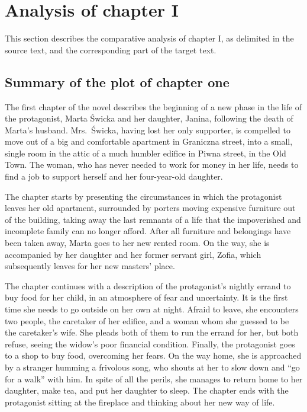 \section{Analysis of chapter I}

This section describes the comparative analysis of chapter I, as delimited in the source text, and the corresponding part of the target text.

\subsection{Summary of the plot of chapter one}
The first chapter of the novel describes the beginning of a new phase in the life of the protagonist, Marta Świcka and her daughter, Janina, following the death of Marta's husband.
Mrs.\ Świcka, having lost her only supporter, is compelled to move out of a big and comfortable apartment in Graniczna street, into a small, single room in the attic of a much humbler edifice in Piwna street, in the Old Town.
The woman, who has never needed to work for money in her life, needs to find a job to support herself and her four-year-old daughter.

The chapter starts by presenting the circumstances in which the protagonist leaves her old apartment, surrounded by porters moving expensive furniture out of the building, taking away the last remnants of a life that the impoverished and incomplete family can no longer afford.
After all furniture and belongings have been taken away, Marta goes to her new rented room.
On the way, she is accompanied by her daughter and her former servant girl, Zofia, which subsequently leaves for her new masters' place.

The chapter continues with a description of the protagonist's nightly errand to buy food for her child, in an atmosphere of fear and uncertainty.
It is the first time she needs to go outside on her own at night.
Afraid to leave, she encounters two people, the caretaker of her edifice, and a woman whom she guessed to be the caretaker's wife.
She pleads both of them to run the errand for her, but both refuse, seeing the widow's poor financial condition.
Finally, the protagonist goes to a shop to buy food, overcoming her fears.
On the way home, she is approached by a stranger humming a frivolous song, who shouts at her to slow down and ``go for a walk'' with him.
In spite of all the perils, she manages to return home to her daughter, make tea, and put her daughter to sleep.
The chapter ends with the protagonist sitting at the fireplace and thinking about her new way of life.

